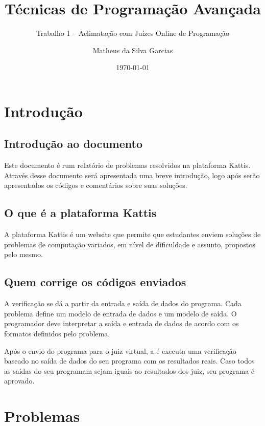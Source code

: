 \documentclass[hidelinks]{article}
\title{Técnicas de Programação Avançada}
\subtitle{Trabalho 1 -- Aclimatação com Juízes Online de Programação}
\date{\today}
\author{Matheus da Silva Garcias}
\begin{document}
    \maketitle
    \newpage
    \tableofcontents
    \newpage

    \section{Introdução}
        \subsection{Introdução ao documento}
            Este documento é rum relatório de problemas resolvidos na plataforma Kattis. Através desse documento será apresentada uma breve introdução, logo após serão apresentados os códigos e comentários sobre suas soluções.
        \subsection{O que é a plataforma Kattis}
            A plataforma Kattis é um website que permite que estudantes enviem soluções de problemas de computação variados, em nível de dificuldade e assunto, propostos pelo mesmo.
        \subsection{Quem corrige os códigos enviados}
            A verificação se dá a partir da entrada e saída de dados do programa. Cada problema define um modelo de entrada de dados e um modelo de saída. O programador deve interpretar a saída e entrada de dados de acordo com os formatos definidos pelo problema.
            \par Após o envio do programa para o juiz virtual, a é executa uma verificação baseado no saída de dados do seu programa com os resultados reais. Caso todos as saídas do seu programam sejam iguais ao resultados dos juiz, seu programa é aprovado.

    \section{Problemas}
\end{document}
